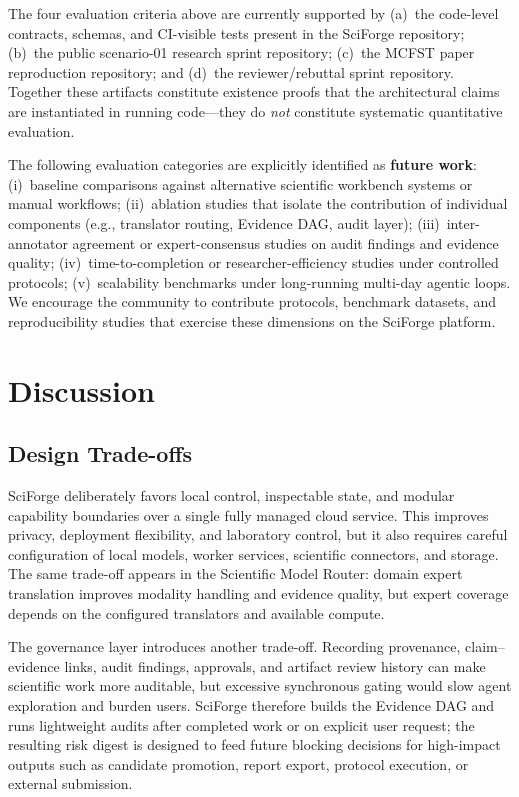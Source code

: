 \documentclass[sn-basic,Numbered,pdflatex]{sn-jnl}
\begin{document}
The four evaluation criteria above are currently supported by (a)~the code-level contracts, schemas, and CI-visible tests present in the SciForge repository; (b)~the public scenario-01 research sprint repository; (c)~the MCFST paper reproduction repository; and (d)~the reviewer/rebuttal sprint repository. Together these artifacts constitute existence proofs that the architectural claims are instantiated in running code---they do \emph{not} constitute systematic quantitative evaluation.

The following evaluation categories are explicitly identified as \textbf{future work}: (i)~baseline comparisons against alternative scientific workbench systems or manual workflows; (ii)~ablation studies that isolate the contribution of individual components (e.g., translator routing, Evidence DAG, audit layer); (iii)~inter-annotator agreement or expert-consensus studies on audit findings and evidence quality; (iv)~time-to-completion or researcher-efficiency studies under controlled protocols; (v)~scalability benchmarks under long-running multi-day agentic loops. We encourage the community to contribute protocols, benchmark datasets, and reproducibility studies that exercise these dimensions on the SciForge platform.


\section{Discussion}

\subsection{Design Trade-offs}

SciForge deliberately favors local control, inspectable state, and modular capability boundaries over a single fully managed cloud service. This improves privacy, deployment flexibility, and laboratory control, but it also requires careful configuration of local models, worker services, scientific connectors, and storage. The same trade-off appears in the Scientific Model Router: domain expert translation improves modality handling and evidence quality, but expert coverage depends on the configured translators and available compute.

The governance layer introduces another trade-off. Recording provenance, claim--evidence links, audit findings, approvals, and artifact review history can make scientific work more auditable, but excessive synchronous gating would slow agent exploration and burden users. SciForge therefore builds the Evidence DAG and runs lightweight audits after completed work or on explicit user request; the resulting risk digest is designed to feed future blocking decisions for high-impact outputs such as candidate promotion, report export, protocol execution, or external submission.
\end{document}
